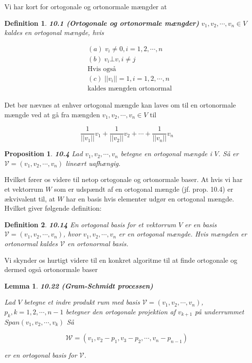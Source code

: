 \documentclass[paper=a4, fontsize=11pt]{scrartcl} %
\newtheorem*{lemma}{Lemma}
\newtheorem*{definition}{Definition}
\newtheorem*{proposition}{Proposition}
\newenvironment{cstmproposition}[1]{\begin{proposition} {\normalfont\textbf{#1}}}{\end{proposition}}
\newenvironment{cstmlemma}[1]{\begin{lemma} {\normalfont\textbf{#1}}}{\end{lemma}}
\newenvironment{cstmdefinition}[1]{\begin{definition} {\normalfont\textbf{#1}}}{\end{definition}}
\begin{document}
	
	
	Vi har kort for ortogonale og ortonormale mængder at 
	
	\begin{cstmdefinition}{10.1 (Ortogonale og ortonormale mængder)}
		$v_1,v_2,\cdots,v_n \in V$ kaldes en ortogonal mængde, hvis
		
		\begin{align*}
			&(a) \; v_i \not = 0, i = 1,2,\cdots,n\\
			&(b) \; v_i \bot v, i \not = j\\
			&\text{Hvis også}\\
			&(c) \; ||v_i|| = 1, i = 1,2,\cdots,n\\
			&\text{kaldes mængden ortonormal}
		\end{align*}
		
	\end{cstmdefinition}
	
	Det bør nævnes at enhver ortogonal mængde kan laves om til en ortonormale mængde ved at gå fra mængden $v_1,v_2,\cdots,v_n \in V$ til
	
	\[\frac{1}{||v_1||}v_1 + \frac{1}{||v_2||}v_2 + \cdots + \frac{1}{||v_n||}v_n\]
	
	\begin{cstmproposition}{10.4}
		Lad $v_1,v_2,\cdots,v_n$ betegne en ortogonal mængde i $V$. Så er $\mathcal{V} = (v_1,v_2,\cdots,v_n)$ lineært uafhængig.
		
		
	\end{cstmproposition}
	
	Hvilket fører os videre til netop ortogonale og ortonormale baser. At hvis vi har et vektorrum $W$ som er udspændt af en ortogonal mængde (jf. prop. 10.4) er ækvivalent til, at $W$ har en basis hvis elementer udgør en ortogonal mængde. Hvilket giver følgende definition:
	
	\begin{cstmdefinition}{10.14}
		En ortogonal basis for et vektorrum $V$ er en basis $\mathcal{V} = (v_1,v_2,\cdots,v_n)$, hvor $v_1,v_2,\cdots,v_n$ er en ortogonal mængde. Hvis mængden er ortonormal kaldes $\mathcal{V}$ en ortonormal basis.
		
	\end{cstmdefinition}
	
	Vi skynder os hurtigt videre til en konkret algoritme til at finde ortogonale og dermed også ortonormale baser
	
	\begin{cstmlemma}{10.22 (Gram-Schmidt processen)}
		
		Lad $V$ betegne et indre produkt rum med basis $\mathcal{V} = (v_1,v_2,\cdots,v_n)$, $p_k, k = 1,2,\cdots,n-1$ betegner den ortogonale projektion af $v_{k+1}$ på underrummet $Span(v_1,v_2,\cdots,v_k)$ Så
		
		\[\mathcal{W} = (v_1,v_2 - p_1,v_3 - p_2,\cdots, v_n - p_{n-1}) \tag{10.17}\]
		
		er en ortogonal basis for $\mathcal{V}$.
		
	\end{cstmlemma}
	
\end{document}
